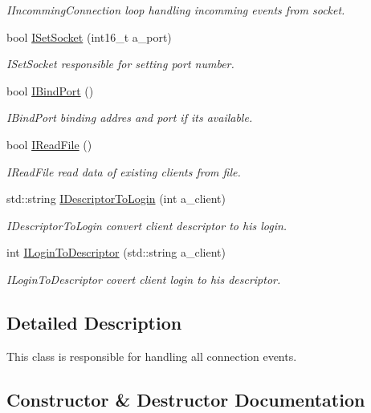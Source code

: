 \begin{DoxyCompactItemize}
\begin{DoxyCompactList}\small\item\em I\+Incomming\+Connection loop handling incomming events from socket. \end{DoxyCompactList}\item 
bool \hyperlink{classServer_a80089a729a3664bf580c27ae5a86d691}{I\+Set\+Socket} (int16\+\_\+t a\+\_\+port)
\begin{DoxyCompactList}\small\item\em I\+Set\+Socket responsible for setting port number. \end{DoxyCompactList}\item 
bool \hyperlink{classServer_a4d95b9a38864072084277bb84421475e}{I\+Bind\+Port} ()
\begin{DoxyCompactList}\small\item\em I\+Bind\+Port binding addres and port if it\textquotesingle{}s available. \end{DoxyCompactList}\item 
bool \hyperlink{classServer_a38db28c597e4759fba3dc831462ba3f3}{I\+Read\+File} ()
\begin{DoxyCompactList}\small\item\em I\+Read\+File read data of existing clients from file. \end{DoxyCompactList}\item 
std\+::string \hyperlink{classServer_ac3697709d2f04345928e0ee2ec2b71d0}{I\+Descriptor\+To\+Login} (int a\+\_\+client)
\begin{DoxyCompactList}\small\item\em I\+Descriptor\+To\+Login convert client descriptor to his login. \end{DoxyCompactList}\item 
int \hyperlink{classServer_a1e9fccb595bba3c40bf11485e369eae4}{I\+Login\+To\+Descriptor} (std\+::string a\+\_\+client)
\begin{DoxyCompactList}\small\item\em I\+Login\+To\+Descriptor covert client login to his descriptor. \end{DoxyCompactList}\end{DoxyCompactItemize}


\subsection{Detailed Description}
This class is responsible for handling all connection events. 

\subsection{Constructor \& Destructor Documentation}
